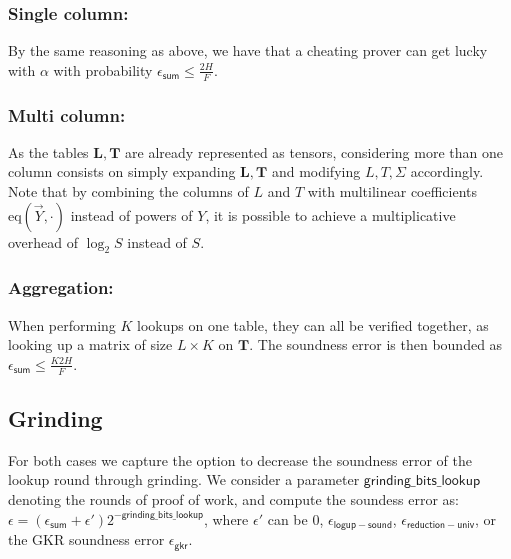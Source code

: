 \subsubsection{Single column:}

By the same reasoning as above, we have that a cheating prover can get lucky with $\alpha$ with probability $\epsilon_{\mathsf{sum}}\leq \frac{2H}{F}$.


\subsubsection{Multi column:}

As the tables $\mathbf L, \mathbf T$ are already represented as tensors, considering more than one column consists on simply expanding $\mathbf L, \mathbf T$ and modifying $L, T, \Sigma$ accordingly. 
Note that by combining the columns of $L$ and $T$ with multilinear coefficients $\text{eq}(\vec{Y}, \cdot)$ instead of powers of $Y$, it is possible to achieve a multiplicative overhead of $\log_2 S$ instead of $S$.

\subsubsection{Aggregation:}

When performing $K$ lookups on one table, they can all be verified together, as looking up a matrix of size $L\times K$ on  $\mathbf T$.
The soundness error is then bounded as $\epsilon_{\mathsf{sum}}\leq \frac{K2H}{F}$.

\subsection{Grinding}

For both cases we capture the option to decrease the soundness error of the lookup round through grinding. We consider a parameter $\mathsf{grinding\_bits\_lookup}$ denoting the rounds of proof of work, and compute the soundess error as: $\epsilon=(\epsilon_{\mathsf{sum}}+\epsilon')2^{\mathsf{-grinding\_bits\_lookup}}$, where $\epsilon'$ can be $0$, $\epsilon_{\mathsf{logup-sound}}$, $\epsilon_{\mathsf{reduction-univ}}$, or the GKR soundness error $\epsilon_{\mathsf{gkr}}.$


